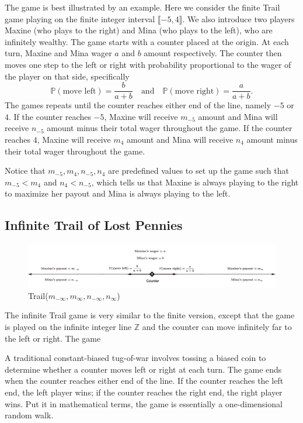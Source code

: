 \documentclass{article}
\newcommand*{\Z}{\mathbb{Z}}
\begin{document}
The game is best illustrated by an example. Here we consider the finite Trail game playing on the
finite integer interval $\llbracket-5, 4\rrbracket$. We also introduce two players Maxine (who plays
to the right) and Mina (who plays to the left), who are infinitely wealthy. The game starts with a
counter placed at the origin. At each turn, Maxine and Mina wager $a$ and $b$ amount respectively.
The counter then moves one step to the left or right with probability proportional to the wager of
the player on that side, specifically $$\mathds{P}(\text{move left}) = \frac{b}{a+b} \quad
\text{and} \quad \mathds{P}(\text{move right}) = \frac{a}{a+b}.$$ The games repeats until the
counter reaches either end of the line, namely $-5$ or $4$. If the counter reaches $-5$, Maxine will
receive $m_{-5}$ amount and Mina will receive $n_{-5}$ amount minus their total wager throughout the
game. If the counter reaches $4$, Maxine will receive $m_{4}$ amount and Mina will receive $n_{4}$
amount minus their total wager throughout the game.

Notice that $m_{-5}, m_4, n_{-5}, n_4$ are predefined values to set up the game such that
$m_{-5}<m_4$ and $n_4<n_{-5}$, which tells us that Maxine is always playing to the right to maximize
her payout and Mina is always playing to the left. 

\subsection{\centering Infinite Trail of Lost Pennies}
\begin{figure}[htb!]
    \centering
    \includegraphics[scale=0.3]{infinite_trail.png}
    \caption{Trail($m_{-\infty}, m_{\infty}, n_{-\infty}, n_{\infty}$)}
\end{figure}

The infinite Trail game is very similar to the finite version, except that the game is played on the 
infinite integer line $\Z$ and the counter can move infinitely far to the left or right. The game


A traditional constant-biased tug-of-war involves tossing a biased coin to determine whether a
counter moves left or right at each turn. The game ends when the counter reaches either end of the
line. If the counter reaches the left end, the left player wins; if the counter reaches the right
end, the right player wins. Put it in mathematical terms, the game is essentially a one-dimensional
random walk.
\end{document}
